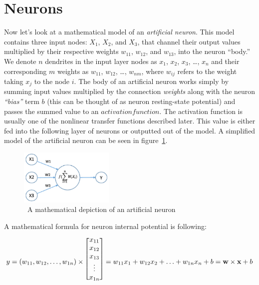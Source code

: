\section{Neurons}\label{sec:neurons}

Now let's look at a mathematical model of an \textit{artificial neuron}.
This model contains three input nodes: $X_1$, $X_2$, and $X_3$, that channel their output values multiplied by their respective weights $w_{11}$, $w_{12}$, and $w_{13}$, into the neuron ``body.''
We denote $n$ dendrites in the input layer nodes as $x_1$, $x_2$, $x_3$, \ldots, $x_n$ and their corresponding $m$ weights as $w_{11}$, $w_{12}$, \ldots, $w_{nm}$, where $w_{ij}$ refers to the weight taking $x_j$ to the node $i$.
The body of an artificial neuron works simply by summing input values multiplied by the connection \textit{weights} along with the neuron \textit{``bias''} term $b$ (this can be thought of as neuron resting-state potential) and passes the summed value to an $activation function$.
The activation function is usually one of the nonlinear transfer functions described later.
This value is either fed into the following layer of neurons or outputted out of the model.
A simplified model of the artificial neuron can be seen in figure~\ref{fig:artificial-neuron}.~\cite{ann-basics}


\begin{figure}
    \centering
    \includegraphics[width=0.4\textwidth]{assets/artificial-neuron}
    \caption{~A mathematical depiction of an artificial neuron~\cite{ann-basics}}\label{fig:artificial-neuron}
\end{figure}

A mathematical formula for neuron internal potential is following: \[ y = (w_{11}, w_{12}, \ldots, w_{1n}) \times
\begin{blockarray}{c}
    \begin{block}{[c]}
        x_{11} \\
        x_{12} \\
        x_{13} \\
        \vdots \\
        x_{1n} \\
    \end{block}%
\end{blockarray}%
= w_{11}x_1 + w_{12}x_2 + \ldots + w_{1n}x_n + b = \textbf{w} \times \textbf{x} + b
\]

